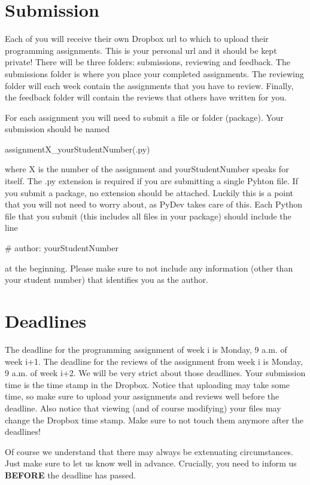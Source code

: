 \documentclass[a4paper, leqno, 11pt]{article}
\begin{document}
\section{Submission} \label{submission}
Each of you will receive their own Dropbox url to which to upload their programming assignments. This is your personal url and it should
be kept private! There will be three folders: submissions, reviewing and feedback. The submissions folder is where you place your
completed assignments. The reviewing folder will each week contain the assignments that you have to review. Finally, the feedback
folder will contain the reviews that others have written for you.

For each assignment you will need to submit a file or folder (package). Your submission should be named
\begin{center}
assignmentX\_yourStudentNumber(.py)
\end{center}
where X is the number of the assignment and yourStudentNumber speaks for itself. The .py extension is required if you are submitting a
single Pyhton file. If you submit a package, no extension should be attached. Luckily this is a point that you will not need 
to worry about, as PyDev takes care of this. Each Python file that you submit (this includes all files in your package) should
include the line
\begin{center}
\# author: yourStudentNumber
\end{center}
at the beginning. Please make sure to not include any information (other than your student number) that identifies you as the author.

\section{Deadlines}
The deadline for the programming assignment of week i is Monday, 9 a.m. of week i+1. The deadline for the reviews of the assignment
from week i is Monday, 9 a.m. of week i+2. We will be very strict about those deadlines. Your submission time is the time stamp in
the Dropbox. Notice that uploading may take some time, so make sure to upload your assignments and reviews well before the deadline.
Also notice that viewing (and of course modifying) your files may change the Dropbox time stamp. Make sure to not touch them anymore
after the deadlines!

Of course we understand that there may always be extenuating circumstances. Just make sure to let us know well in advance. Crucially,
you need to inform us \textbf{BEFORE} the deadline has passed.
\end{document}
